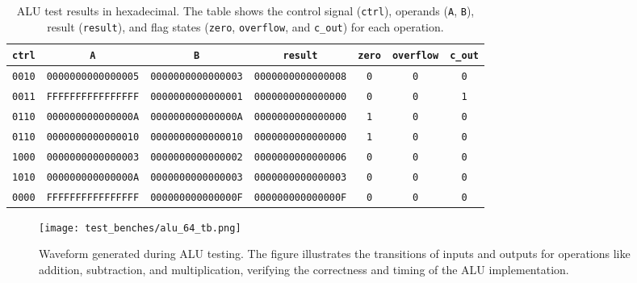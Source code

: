 \documentclass[12pt]{article}
\begin{document}
\begin{table}[ht!]
    \centering
    \renewcommand{\arraystretch}{1.1}
    \setlength{\tabcolsep}{2pt}
    \begin{tabular}{|c|c|c|c|c|c|c|}
        \hline
        \textbf{\texttt{ctrl}} & \textbf{\texttt{A}} & \textbf{\texttt{B}} & \textbf{\texttt{result}} & \textbf{\texttt{zero}} & \textbf{\texttt{overflow}} & \textbf{\texttt{c\_out}} \\
        \hline
        \texttt{0010} & \texttt{0000000000000005} & \texttt{0000000000000003} & \texttt{0000000000000008} & \texttt{0} & \texttt{0} & \texttt{0} \\
        \texttt{0011} & \texttt{FFFFFFFFFFFFFFFF} & \texttt{0000000000000001} & \texttt{0000000000000000} & \texttt{0} & \texttt{0} & \texttt{1} \\
        \texttt{0110} & \texttt{000000000000000A} & \texttt{000000000000000A} & \texttt{0000000000000000} & \texttt{1} & \texttt{0} & \texttt{0} \\
        \texttt{0110} & \texttt{0000000000000010} & \texttt{0000000000000010} & \texttt{0000000000000000} & \texttt{1} & \texttt{0} & \texttt{0} \\
        \texttt{1000} & \texttt{0000000000000003} & \texttt{0000000000000002} & \texttt{0000000000000006} & \texttt{0} & \texttt{0} & \texttt{0} \\
        \texttt{1010} & \texttt{000000000000000A} & \texttt{0000000000000003} & \texttt{0000000000000003} & \texttt{0} & \texttt{0} & \texttt{0} \\
        \texttt{0000} & \texttt{FFFFFFFFFFFFFFFF} & \texttt{000000000000000F} & \texttt{000000000000000F} & \texttt{0} & \texttt{0} & \texttt{0} \\
        \hline
    \end{tabular}
    \caption{ALU test results in hexadecimal. The table shows the control signal (\texttt{ctrl}), operands (\texttt{A}, \texttt{B}), result (\texttt{result}), and flag states (\texttt{zero}, \texttt{overflow}, and \texttt{c\_out}) for each operation.}
    \label{tab:alu_results}
\end{table}

\begin{figure}[ht!]
    \centering
    \texttt{[image: test\_benches/alu\_64\_tb.png]}
    \caption{Waveform generated during ALU testing. The figure illustrates the transitions of inputs and outputs for operations like addition, subtraction, and multiplication, verifying the correctness and timing of the ALU implementation.}
    \label{fig:alu_waveform}
\end{figure}
\end{document}
